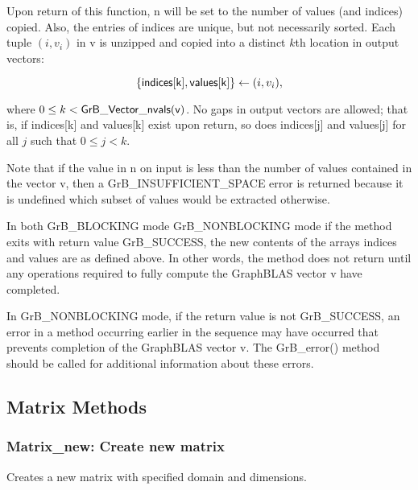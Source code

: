 Upon return of this function, {\sf n} will be set to the number of values (and 
indices) copied.  Also, the entries of {\sf indices} are unique, but not 
necessarily sorted.  Each tuple $(i,v_i)$ in {\sf v} is unzipped and copied 
into a distinct $k$th location in output vectors:

$$ \{{\sf indices[k]}, {\sf values[k]}\} \leftarrow (i,v_i),$$

where $0 \leq k < {\sf GrB\_Vector\_nvals(v)}$. No gaps in
output vectors are allowed; that is, if {\sf indices[k]} and {\sf values[k]} 
exist upon return, so does
{\sf indices[j]} and {\sf values[j]} for all $j$ such that $0 \leq j < k$.

Note that if the value in {\sf n} on input is less than the number of values
contained in the vector {\sf v}, then a {\sf GrB\_INSUFFICIENT\_SPACE} error 
is returned because it is undefined which subset of values would
be extracted otherwise.

In both {\sf GrB\_BLOCKING} mode {\sf GrB\_NONBLOCKING} mode
if the method exits with return value {\sf GrB\_SUCCESS}, the  new 
contents of the arrays {\sf indices} and {\sf values} are as defined above.  In 
other words, the method does not return until any operations required to fully 
compute the GraphBLAS vector {\sf v} have completed. 

In {\sf GrB\_NONBLOCKING} mode, if the return value is 
not {\sf GrB\_SUCCESS}, an error in a method occurring earlier in the sequence
may have occurred that prevents completion of the GraphBLAS vector {\sf v}.
The {\sf GrB\_error()} method should be called for additional information 
about these errors.



\subsection{Matrix Methods}

\subsubsection{{\sf Matrix\_new}: Create new matrix}

Creates a new matrix with specified domain and dimensions.

\paragraph{\syntax}

